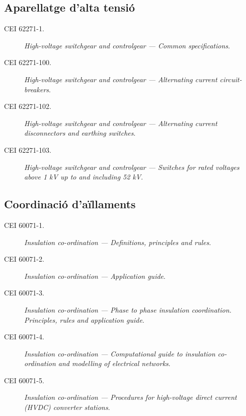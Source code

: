 \subsection*{Aparellatge d'alta tensió}
\begin{description}
    \item [\hspace{5mm}CEI 62271-1.] \textit{High-voltage switchgear and controlgear --- Common specifications}.
    \item [\hspace{5mm}CEI 62271-100.] \textit{High-voltage switchgear and controlgear --- Alternating current circuit-breakers}.
    \item [\hspace{5mm}CEI 62271-102.] \textit{High-voltage switchgear and controlgear --- Alternating current disconnectors and earthing switches}.
    \item [\hspace{5mm}CEI 62271-103.] \textit{High-voltage switchgear and controlgear --- Switches for rated voltages above 1 kV up to and including 52 kV}.
\end{description}

\subsection*{Coordinació d'aïllaments}
\begin{description}
    \item [\hspace{5mm}CEI 60071-1.] \textit{Insulation co-ordination --- Definitions, principles and rules}.
    \item [\hspace{5mm}CEI 60071-2.] \textit{Insulation co-ordination --- Application guide}.
    \item [\hspace{5mm}CEI 60071-3.] \textit{Insulation co-ordination --- Phase to phase insulation coordination. Principles, rules and application guide}.
    \item [\hspace{5mm}CEI 60071-4.] \textit{Insulation co-ordination --- Computational guide to insulation co-ordination and modelling of electrical networks}.
    \item [\hspace{5mm}CEI 60071-5.] \textit{Insulation co-ordination --- Procedures for high-voltage direct current (HVDC) converter stations}.
\end{description}


